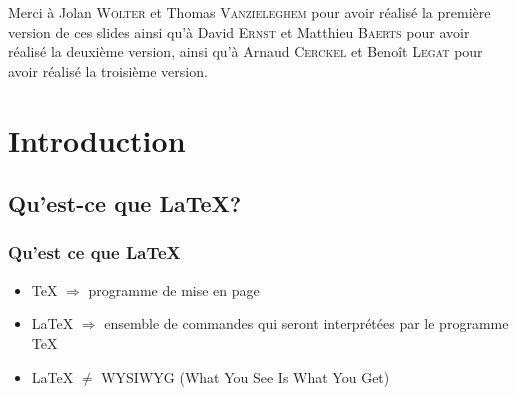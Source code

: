 \documentclass[10pt,svgnames,usenames,table]{beamer} %
\begin{document}
\begin{frame}
  \maketitle
  Merci à Jolan \textsc{Wolter} et Thomas \textsc{Vanzieleghem} pour avoir réalisé la première version de ces slides
  ainsi qu'à David \textsc{Ernst} et Matthieu \textsc{Baerts} pour avoir réalisé la deuxième version, ainsi qu'à Arnaud \textsc{Cerckel} et Benoît \textsc{Legat} pour avoir réalisé la troisième version.
\end{frame}


\section{Introduction}
\subsection{Qu'est-ce que \LaTeX{}?}
\begin{frame}
\frametitle{Qu'est ce que \LaTeX}

\begin{itemize}
\item \TeX{} $ \Rightarrow$ programme de mise en page
\vspace{0.5cm}
\item \LaTeX{} $ \Rightarrow$ ensemble de commandes qui seront
 interprétées par le programme \TeX
 \vspace{0.5cm}
\item \LaTeX{} $ \neq$ WYSIWYG (What You See Is What You Get)
\end{itemize}

\end{frame}
\end{document}
